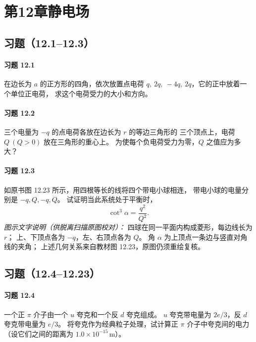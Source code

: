 \section*{第12章\quad 静电场}
\subsection*{习题（12.1--12.3）}

\paragraph{习题 12.1}
在边长为 \(a\) 的正方形的四角，依次放置点电荷
\(q,\ 2q,\ -4q,\ 2q\)，它的正中放着一个单位正电荷，
求这个电荷受力的大小和方向。

\paragraph{习题 12.2}
三个电量为 \(-q\) 的点电荷各放在边长为 \(r\) 的等边三角形的
三个顶点上，电荷 \(Q\ (Q>0)\) 放在三角形的重心上。
为使每个负电荷受力为零，\(Q\) 之值应为多大？

\paragraph{习题 12.3}
如原书图 12.23 所示，用四根等长的线将四个带电小球相连，
带电小球的电量分别是 \(-q,Q,-q,Q\)。
试证明当此系统处于平衡时，
\[
 \cot^3\alpha=\frac{q^2}{Q^2}.
\]
\textit{图示文字说明（供脱离扫描原图校对）：}
四球在同一平面内构成菱形，每边线长为 \(r\)；
上、下顶点各为 \(-q\)，左、右顶点各为 \(Q\)。
角 \(\alpha\) 为上顶点一条边与竖直对角线的夹角；
上述几何关系来自教材图 12.23，原图仍须重绘复核。


\subsection*{习题（12.4--12.23）}

\paragraph{习题 12.4}
一个正 \(\pi\) 介子由一个 \(u\) 夸克和一个反 \(d\) 夸克组成。
\(u\) 夸克带电量为 \(2e/3\)，反 \(d\) 夸克带电量为 \(e/3\)。
将夸克作为经典粒子处理，试计算正 \(\pi\) 介子中夸克间的电力
（设它们之间的距离为 \(1.0\times10^{-15}\,\mathrm m\)）。

